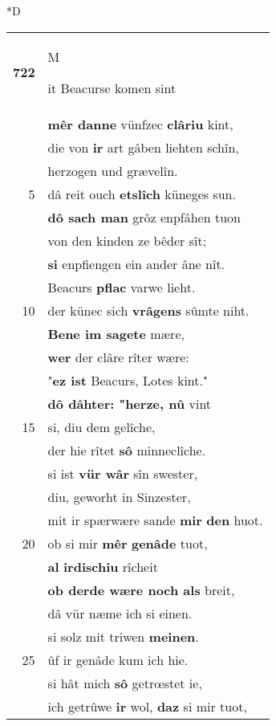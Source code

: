 \documentclass[8pt,a4paper,notitlepage]{article}
\begin{document}
\begin{table}[ht]
\begin{minipage}[t]{0.5\linewidth}
\small
\begin{center}*D
\end{center}
\begin{tabular}{rl}
\textbf{722} & \begin{large}M\end{large}it Beacurse komen sint\\ 
 & \textbf{mêr danne} vünfzec \textbf{clâriu} kint,\\ 
 & die von \textbf{ir} art gâben liehten schîn,\\ 
 & herzogen und grævelîn.\\ 
5 & dâ reit ouch \textbf{etslîch} küneges sun.\\ 
 & \textbf{dô sach man} grôz enpfâhen tuon\\ 
 & von den kinden ze bêder sît;\\ 
 & \textbf{si} enpfiengen ein ander âne nît.\\ 
 & Beacurs \textbf{pflac} varwe lieht.\\ 
10 & der künec sich \textbf{vrâgens} sûmte niht.\\ 
 & \textbf{Bene im sagete} mære,\\ 
 & \textbf{wer} der clâre rîter wære:\\ 
 & "\textbf{ez ist} Beacurs, Lotes kint."\\ 
 & \textbf{dô dâhter: "herze, nû} vint\\ 
15 & si, diu dem gelîche,\\ 
 & der hie rîtet \textbf{sô} minneclîche.\\ 
 & si ist \textbf{vür wâr} sîn swester,\\ 
 & diu, geworht in Sinzester,\\ 
 & mit ir spærwære sande \textbf{mir} \textbf{den} huot.\\ 
20 & ob si mir \textbf{mêr} \textbf{genâde} tuot,\\ 
 & \textbf{al} \textbf{irdischiu} rîcheit\\ 
 & \textbf{ob derde wære noch als} breit,\\ 
 & dâ vür næme ich si einen.\\ 
 & si solz mit triwen \textbf{meinen}.\\ 
25 & ûf ir genâde kum ich hie.\\ 
 & si hât mich \textbf{sô} getrœstet ie,\\ 
 & ich getrûwe \textbf{ir} wol, \textbf{daz} si mir tuot,\\ 

\end{tabular}
\end{minipage}
\end{table}
\end{document}
